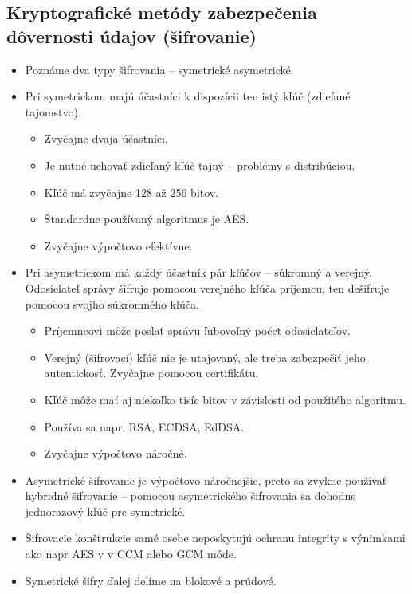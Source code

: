 \documentclass[12pt,a4paper]{article}
\begin{document}
{    \subsection{Kryptografické metódy zabezpečenia dôvernosti údajov (šifrovanie)}
    \begin{itemize}
        \item Poznáme dva typy šifrovania -- symetrické asymetrické.
        \item Pri symetrickom majú účastníci k dispozícii ten istý kľúč (zdieľané tajomstvo).
        \begin{itemize}
            \item Zvyčajne dvaja účastníci.
            \item Je nutné uchovať zdieľaný kľúč tajný -- problémy s distribúciou.
            \item Kľúč má zvyčajne 128 až 256 bitov.
            \item Štandardne používaný algoritmus je AES.
            \item Zvyčajne výpočtovo efektívne.
        \end{itemize}
        \item Pri asymetrickom má každy účastník pár kľúčov -- súkromný a verejný. Odosielateľ správy šifruje pomocou verejného kľúča príjemcu, ten dešifruje pomocou svojho súkromného kľúča.
        \begin{itemize}
            \item Príjemncovi môže poslať správu ľubovoľný počet odosielateľov.
            \item Verejný (šifrovací) kľúč nie je utajovaný, ale treba zabezpečiť jeho autentickosť. Zvyčajne pomocou certifikátu.
            \item Kľúč môže mať aj niekoľko tisíc bitov v závislosti od použitého algoritmu.
            \item Používa sa napr. RSA, ECDSA, EdDSA.
            \item Zvyčajne výpočtovo náročné.
        \end{itemize}
        \item Asymetrické šifrovanie je výpočtovo náročnejšie, preto sa zvykne používať hybridné šifrovanie -- pomocou asymetrického šifrovania sa dohodne jednorazový kľúč pre symetrické.
        \item Šifrovacie konštrukcie samé osebe neposkytujú ochranu integrity s výnimkami ako napr AES v v CCM alebo GCM móde.
        \item Symetrické šifry ďalej delíme na blokové a prúdové.

\end{itemize}}
\end{document}
